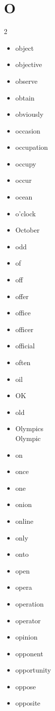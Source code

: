 \documentclass[../../book.tex]{subfiles}
\begin{document}
\section{O}
\raggedcolumns
\begin{multicols}{2}
\begin{itemize}
\item[-] object
\item[-] objective
\item[-] observe
\item[-] obtain
\item[-] obviously
\item[-] occasion
\item[-] occupation
\item[-] occupy
\item[-] occur
\item[-] ocean
\item[-] o{\textquoteright}clock
\item[-] October
\item[-] odd
\item[-] of
\item[-] off
\item[-] offer
\item[-] office
\item[-] officer
\item[-] official
\item[-] often
\item[-] oil
\item[-] OK
\item[-] old
\item[-] Olympics
\\Olympic
\item[-] on
\item[-] once
\item[-] one
\item[-] onion
\item[-] online
\item[-] only
\item[-] onto
\item[-] open
\item[-] opera
\item[-] operation
\item[-] operator
\item[-] opinion
\item[-] opponent
\item[-] opportunity
\item[-] oppose
\item[-] opposite

\end{itemize}
\end{multicols}
\end{document}
